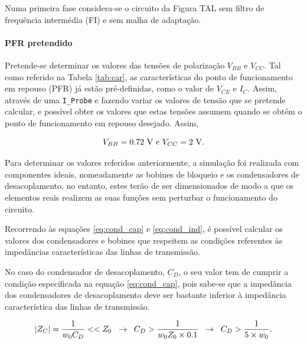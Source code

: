 \documentclass[11pt]{article}
\numberwithin{equation}{section}
\begin{document}
Numa primeira fase considera-se o circuito da Figura TAL sem filtro de frequência intermédia (FI) e sem malha de adaptação.

\paragraph{PFR pretendido} \hspace{0pt} 

Pretende-se determinar os valores das tensões de polarização $V_{BB}$ e $V_{CC}$. Tal como referido na Tabela \ref{tab:car}, as características do ponto de funcionamento em repouso (PFR) já estão pré-definidas, como o valor de $V_{CE}$ e $I_{C}$. Assim, através de uma \texttt{I\_Probe} e fazendo variar os valores de tensão que se pretende calcular, e possível obter os valores que estas tensões assumem quando se obtém o ponto de funcionamento em repouso desejado. Assim,

\vspace{-3mm}
\begin{equation}
\centering
V_{BB} = 0.72~\text{V} ~ e ~ V_{CC} = 2~\text{V}.
\end{equation}

\vspace{1mm} 
Para determinar os valores referidos anteriormente, a simulação foi realizada com componentes ideais, nomeadamente as bobines de bloqueio e os condensadores de desacoplamento, no entanto, estes terão de ser dimensionados de modo a que os elementos reais realizem as suas funções sem perturbar o funcionamento do circuito.

Recorrendo às equações \ref{eq:cond_cap} e \ref{eq:cond_ind}, é possível calcular os valores dos condensadores e bobines que respeitem as condições referentes às impedâncias características das linhas de transmissão.

No caso do condensador de desacoplamento, $C_{D}$, o seu valor tem de cumprir a condição especificada na equação \ref{eq:cond_cap}, pois sabe-se que a impedância dos condensadores de desacoplamento deve ser bastante inferior à impedância característica das linhas de transmissão. 

\vspace{-3mm}
\begin{equation}
	\lvert Z_C \rvert = \frac{1}{w_{0} C_{D}} << Z_0 \hspace{2mm} \rightarrow \hspace{2mm} C_{D} > \frac{1}{w_{0}Z_0 \times 0.1} \hspace{2mm} \rightarrow \hspace{2mm} C_{D} > \dfrac{1}{5 \times w_{0}}.
	\label{eq:cond_cap}
\end{equation}
\end{document}

